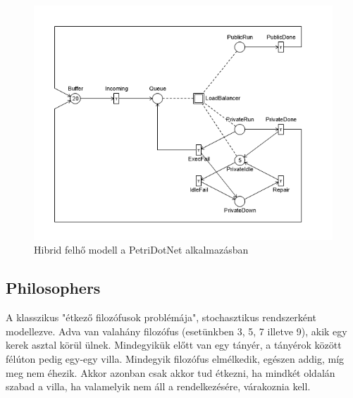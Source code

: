 \begin{figure}
	\centering
	\includegraphics[width=140mm, keepaspectratio]{figures/hybc.png}
	\caption{Hibrid felhő modell a PetriDotNet alkalmazásban}
\end{figure}

\subsection{Philosophers}

A klasszikus "étkező filozófusok problémája", stochasztikus rendszerként modellezve.
Adva van valahány filozófus (esetünkben 3, 5, 7 illetve 9), akik egy kerek asztal körül ülnek. Mindegyikük előtt van egy tányér, a tányérok között félúton pedig egy-egy villa. Mindegyik filozófus elmélkedik, egészen addig, míg meg nem éhezik. Akkor azonban csak akkor tud étkezni, ha mindkét oldalán szabad a villa, ha valamelyik nem áll a rendelkezésére, várakoznia kell.

